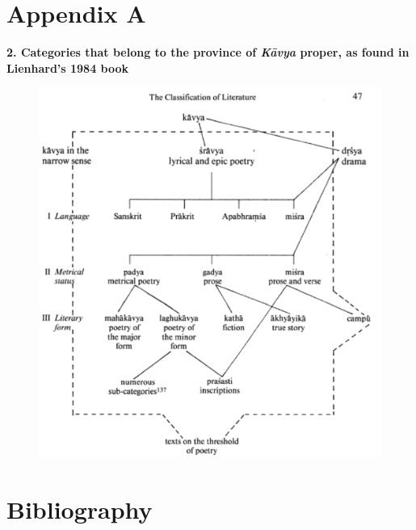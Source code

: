 \section*{Appendix A}

\textbf{2. Categories that belong to the province of \textit{Kāvya} proper, as found in Lienhard’s 1984 book}
\begin{figure}[H]
\centering
\includegraphics[scale=.5]{images/chapter8/image1.png}
\end{figure}


\section*{Bibliography}

